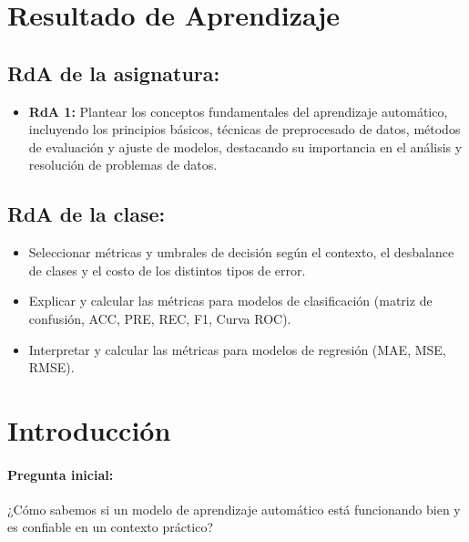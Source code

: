 \documentclass[a4,11pt]{aleph-notas}
\begin{document}
\encabezado

\section*{Resultado de Aprendizaje}

\subsection*{RdA de la asignatura:}
\begin{itemize}[leftmargin=*]
    \item \textbf{RdA 1:} Plantear los conceptos fundamentales del aprendizaje automático, incluyendo los principios básicos, técnicas de preprocesado de datos, métodos de evaluación y ajuste de modelos, destacando su importancia en el análisis y resolución de problemas de datos.
\end{itemize}

\subsection*{RdA de la clase:}
\begin{itemize}[leftmargin=*]
    \item Seleccionar métricas y umbrales de decisión según el contexto, el desbalance de clases y el costo de los distintos tipos de error.
    \item Explicar y calcular las métricas para modelos de clasificación (matriz de confusión, ACC, PRE, REC, F1, Curva ROC).
    \item Interpretar y calcular las métricas para modelos de regresión (MAE, MSE, RMSE).
\end{itemize}

\section*{Introducción}

\paragraph{Pregunta inicial:} 
¿Cómo sabemos si un modelo de aprendizaje automático está funcionando bien y es confiable en un contexto práctico?
\end{document}
